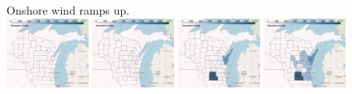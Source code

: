 \documentclass[xcolor=dvipsnames]{beamer}
\begin{document}
\begin{frame}
\item Onshore wind ramps up. \\
  \includegraphics[width=0.2\textwidth]{includes/no_leakage_no_shutdowns_wind_r0.png}
  \includegraphics[width=0.2\textwidth]{includes/no_leakage_no_shutdowns_wind_r2.png}
  \includegraphics[width=0.2\textwidth]{includes/no_leakage_no_shutdowns_wind_r3.png}
  \includegraphics[width=0.2\textwidth]{includes/no_leakage_no_shutdowns_wind_r4.png}
%
\end{frame}
\end{document}
